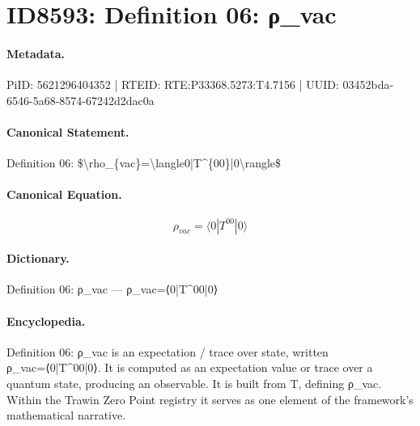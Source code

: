 \section*{ID8593: Definition 06: ρ\_vac}
\paragraph{Metadata.}
PiID: 5621296404352 | RTEID: RTE:P33368.5273:T4.7156 | UUID: 03452bda-6546-5a68-8574-67242d2dac0a

\paragraph{Canonical Statement.}
Definition 06: \$\textbackslash{}rho\_\{vac\}=\textbackslash{}langle0|T\textasciicircum{}\{00\}|0\textbackslash{}rangle\$

\paragraph{Canonical Equation.}
\[
\rho_{vac}=\langle0|T^{00}|0\rangle
\]

\paragraph{Dictionary.}
Definition 06: ρ\_vac — ρ\_vac=⟨0|T\textasciicircum{}00|0⟩

\paragraph{Encyclopedia.}
Definition 06: ρ\_vac is an expectation / trace over state, written ρ\_vac=⟨0|T\textasciicircum{}00|0⟩. It is computed as an expectation value or trace over a quantum state, producing an observable. It is built from T, defining ρ\_vac. Within the Trawin Zero Point registry it serves as one element of the framework's mathematical narrative.
